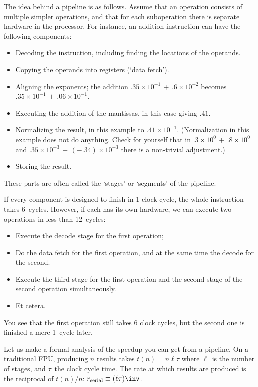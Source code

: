 The idea behind a
pipeline is as follows. Assume that an operation consists of multiple
simpler operations, and that for each suboperation there is separate
hardware in the processor.
For instance, an addition instruction can have the following components:
\begin{itemize}
\item Decoding the instruction, including finding the locations of the
  operands.
\item Copying the operands into registers (`data fetch').
\item Aligning the exponents; the addition
  $.35\times 10^{-1}\,+\, .6\times 10^{-2}$ becomes 
  $.35\times 10^{-1}\,+\, .06\times 10^{-1}$.
\item Executing the addition of the mantissas, in this case giving 
  $.41$.
\item Normalizing the result, in this example to $.41\times
  10^{-1}$. (Normalization in this example does not do anything. Check
  for yourself that in 
  $.3\times10^0\,+\,.8\times 10^0$ and 
  $.35\times10^{-3}\,+\,(-.34)\times 10^{-3}$ there is a non-trivial
  adjustment.)
\item Storing the result.
\end{itemize}
These parts are often called the `stages' or `segments' of the pipeline.

If every component is designed to finish in 1 clock cycle, the whole
instruction takes 6~cycles. However, if each has its own hardware, we
can execute two operations in less than 12~cycles:
\begin{itemize}
\item Execute the decode stage for the first operation;
\item Do the data fetch for the first operation, and at the same time
  the decode for the second.
\item Execute the third stage for the first operation and the second
  stage of the second operation simultaneously.
\item Et cetera.
\end{itemize}
You see that the first operation still takes 6 clock cycles, but the
second one is finished a mere 1~cycle later. 

Let us make a formal analysis of the speedup you can get from a
pipeline. On a traditional \ac{FPU}, producing $n$ results
takes $t(n)=n\ell\tau$ where $\ell$~is the number of stages, and
$\tau$~the clock cycle time. The rate at which results are produced is
the reciprocal of $t(n)/n$: $r_{\mathrm{serial}}\equiv(\ell\tau)\inv$.

